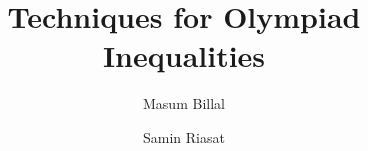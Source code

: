 \documentclass[a4paper, 12pt]{book}
\title{\bfseries Techniques for Olympiad Inequalities}
\author{Masum Billal\and Samin Riasat}
\begin{document}
	\frontmatter
	\maketitle
	\tableofcontents
	\mainmatter
	
	\begin{refsection}
		
		\printbibliography
	\end{refsection}
	
	\begin{refsection}
		
		\printbibliography
	\end{refsection}

	\begin{refsection}
		
		\printbibliography
	\end{refsection}

	\begin{refsection}
		
		\printbibliography
	\end{refsection}

	\begin{refsection}
		
		\printbibliography
	\end{refsection}

	\begin{refsection}
		
		\printbibliography
	\end{refsection}

	\begin{refsection}
		
		\printbibliography
	\end{refsection}
	
	\begin{refsection}
		
		\printbibliography
	\end{refsection}

	\begin{refsection}
		
		\printbibliography
	\end{refsection}

	\begin{refsection}
		
		\printbibliography
	\end{refsection}

	\begin{refsection}
		
		\printbibliography
	\end{refsection}

	\begin{refsection}
		
		\printbibliography
	\end{refsection}

	\begin{refsection}
		
		\printbibliography
	\end{refsection}

	\begin{refsection}
		
		\printbibliography
	\end{refsection}
	\backmatter
\end{document}
